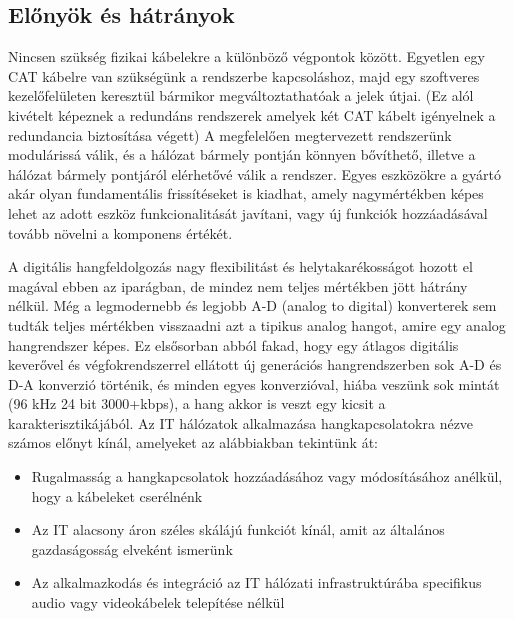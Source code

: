 \subsection{Előnyök és hátrányok}
Nincsen szükség fizikai kábelekre a különböző végpontok között. Egyetlen egy CAT kábelre van szükségünk a rendszerbe kapcsoláshoz, majd egy
szoftveres kezelőfelületen keresztül bármikor megváltoztathatóak a jelek útjai. (Ez alól kivételt képeznek a redundáns rendszerek amelyek két CAT kábelt igényelnek a redundancia biztosítása végett)
A megfelelően megtervezett rendszerünk modulárissá válik, és a hálózat bármely pontján könnyen bővíthető, illetve a hálózat bármely pontjáról elérhetővé válik a rendszer.
Egyes eszközökre a gyártó akár olyan fundamentális frissítéseket is kiadhat, amely nagymértékben képes lehet az adott eszköz funkcionalitását javítani,
vagy új funkciók hozzáadásával tovább növelni a komponens értékét.

A digitális hangfeldolgozás nagy flexibilitást és helytakarékosságot hozott el
magával ebben az iparágban, de mindez nem teljes mértékben jött hátrány nélkül.
Még a legmodernebb és legjobb A-D (analog to digital) konverterek sem tudták
teljes mértékben visszaadni azt a tipikus analog hangot, amire egy analog
hangrendszer képes. Ez elsősorban abból fakad, hogy egy átlagos digitális
keverővel és végfokrendszerrel ellátott új generációs hangrendszerben sok A-D és
D-A konverzió történik, és minden egyes konverzióval, hiába veszünk sok mintát
(96 kHz 24 bit 3000+kbps), a hang akkor is veszt egy kicsit a
karakterisztikájából.
Az IT hálózatok alkalmazása hangkapcsolatokra nézve számos előnyt kínál,
amelyeket az alábbiakban tekintünk át:

\begin{itemize}
	\item Rugalmasság a hangkapcsolatok hozzáadásához vagy módosításához anélkül,
	      hogy a kábeleket cserélnénk
\end{itemize}


\begin{itemize}
	\item Az IT alacsony áron széles skálájú funkciót kínál, amit az általános
	      gazdaságosság elveként ismerünk
\end{itemize}


\begin{itemize}
	\item Az alkalmazkodás és integráció az IT hálózati infrastruktúrába
	      specifikus audio vagy videokábelek telepítése nélkül
\end{itemize}


